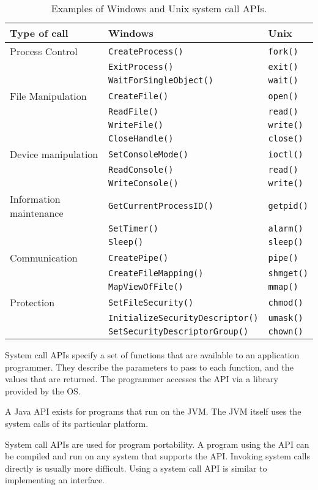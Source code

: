 \begin{table}[htp]
  \centering
  \caption*{Examples of Windows and Unix system call APIs.}
  \begin{tabular}{lll}
    \toprule
    Type of call & Windows & Unix \\
    \midrule
    Process Control & \texttt{CreateProcess()}       & \texttt{fork()} \\
                    & \texttt{ExitProcess()}         & \texttt{exit()} \\
                    & \texttt{WaitForSingleObject()} & \texttt{wait()} \\
    File Manipulation & \texttt{CreateFile()}  & \texttt{open()}  \\
                      & \texttt{ReadFile()}    & \texttt{read()}  \\
                      & \texttt{WriteFile()}   & \texttt{write()} \\
                      & \texttt{CloseHandle()} & \texttt{close()} \\
    Device manipulation & \texttt{SetConsoleMode()} & \texttt{ioctl()} \\
                        & \texttt{ReadConsole()}    & \texttt{read()}  \\
                        & \texttt{WriteConsole()}   & \texttt{write()} \\
    Information maintenance & \texttt{GetCurrentProcessID()} & \texttt{getpid()} \\
                            & \texttt{SetTimer()}            & \texttt{alarm()}  \\
                            & \texttt{Sleep()}               & \texttt{sleep()}  \\
    Communication & \texttt{CreatePipe()}        & \texttt{pipe()}   \\
                  & \texttt{CreateFileMapping()} & \texttt{shmget()} \\
                  & \texttt{MapViewOfFile()}     & \texttt{mmap()}   \\
    Protection & \texttt{SetFileSecurity()}              & \texttt{chmod()} \\
               & \texttt{InitializeSecurityDescriptor()} & \texttt{umask()} \\
               & \texttt{SetSecurityDescriptorGroup()}   & \texttt{chown()} \\
    \bottomrule
  \end{tabular}
\end{table}

System call APIs specify a set of functions that are available to an application programmer.
They describe the parameters to pass to each function, and the values that are returned.
The programmer accesses the API via a library provided by the OS.

A Java API exists for programs that run on the JVM\@.
The JVM itself uses the system calls of its particular platform.

System call APIs are used for program portability.
A program using the API can be compiled and run on any system that supports the API\@.
Invoking system calls directly is usually more difficult.
Using a system call API is similar to implementing an interface.
